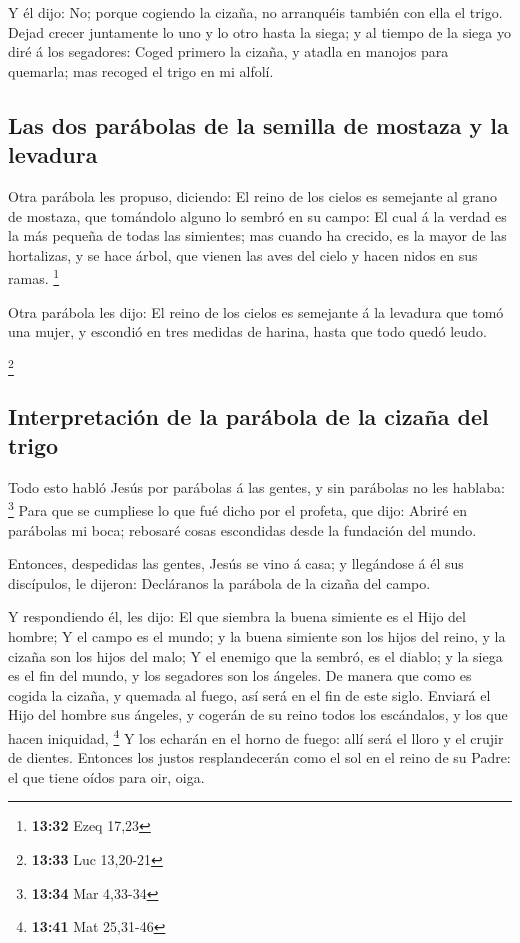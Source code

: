  Y él dijo: No; porque cogiendo la cizaña, no arranquéis
también con ella el trigo.  Dejad crecer juntamente lo uno
y lo otro hasta la siega; y al tiempo de la siega yo diré á los
segadores: Coged primero la cizaña, y atadla en manojos para quemarla;
mas recoged el trigo en mi alfolí.

\hypertarget{las-dos-paruxe1bolas-de-la-semilla-de-mostaza-y-la-levadura}{%
\subsection{Las dos parábolas de la semilla de mostaza y la
levadura}\label{las-dos-paruxe1bolas-de-la-semilla-de-mostaza-y-la-levadura}}

 Otra parábola les propuso, diciendo: El reino de los
cielos es semejante al grano de mostaza, que tomándolo alguno lo sembró
en su campo:  El cual á la verdad es la más pequeña de
todas las simientes; mas cuando ha crecido, es la mayor de las
hortalizas, y se hace árbol, que vienen las aves del cielo y hacen nidos
en sus ramas. \footnote{\textbf{13:32} Ezeq 17,23}

 Otra parábola les dijo: El reino de los cielos es
semejante á la levadura que tomó una mujer, y escondió en tres medidas
de harina, hasta que todo quedó leudo.

\footnote{\textbf{13:33} Luc 13,20-21}

\hypertarget{interpretaciuxf3n-de-la-paruxe1bola-de-la-cizauxf1a-del-trigo}{%
\subsection{Interpretación de la parábola de la cizaña del
trigo}\label{interpretaciuxf3n-de-la-paruxe1bola-de-la-cizauxf1a-del-trigo}}

 Todo esto habló Jesús por parábolas á las gentes, y sin
parábolas no les hablaba: \footnote{\textbf{13:34} Mar 4,33-34}
 Para que se cumpliese lo que fué dicho por el profeta, que
dijo: Abriré en parábolas mi boca; rebosaré cosas escondidas desde la
fundación del mundo.

 Entonces, despedidas las gentes, Jesús se vino á casa; y
llegándose á él sus discípulos, le dijeron: Decláranos la parábola de la
cizaña del campo.

 Y respondiendo él, les dijo: El que siembra la buena
simiente es el Hijo del hombre;  Y el campo es el mundo; y
la buena simiente son los hijos del reino, y la cizaña son los hijos del
malo;  Y el enemigo que la sembró, es el diablo; y la siega
es el fin del mundo, y los segadores son los ángeles.  De
manera que como es cogida la cizaña, y quemada al fuego, así será en el
fin de este siglo.  Enviará el Hijo del hombre sus ángeles,
y cogerán de su reino todos los escándalos, y los que hacen iniquidad,
\footnote{\textbf{13:41} Mat 25,31-46}  Y los echarán en el
horno de fuego: allí será el lloro y el crujir de dientes. 
Entonces los justos resplandecerán como el sol en el reino de su Padre:
el que tiene oídos para oir, oiga.

